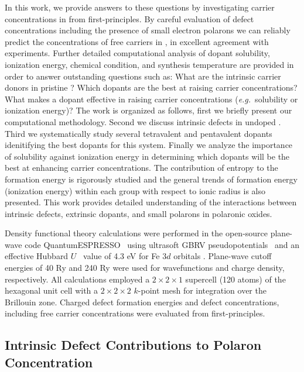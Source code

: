 In this work, we provide answers to these questions by investigating carrier concentrations in  from first-principles. By careful evaluation of defect concentrations including the presence of small electron polarons we can reliably predict the concentrations of free carriers in , in excellent agreement with experiments.
Further detailed computational analysis of dopant solubility, ionization energy, chemical condition, and synthesis temperature are provided in order to answer outstanding questions such as: What are the intrinsic carrier donors in pristine ? Which dopants are the best at raising carrier concentrations? What makes a dopant effective in raising carrier concentrations (\textit{e.g.}\ solubility or ionization energy)?
The work is organized as follows, first we briefly present our computational methodology. Second we discuss intrinsic defects in undoped . Third we systematically study several tetravalent and pentavalent dopants idenitifying the best dopants for this system. Finally we analyze the importance of solubility against ionization energy in determining which dopants will be the best at enhancing carrier concentrations. The contribution of entropy to the formation energy is rigorously studied and the general trends of formation energy (ionization energy) within each group with respect to ionic radius is also presented.
This work provides detailed understanding of the interactions between intrinsic defects, extrinsic dopants, and small polarons in polaronic oxides.

Density functional theory calculations were performed in the open-source plane-wave code QuantumESPRESSO~\cite{QE1} using ultrasoft GBRV pseudopotentials~\cite{gbrv} and an effective Hubbard $U$~\cite{dudarev1998electron} value of 4.3 eV for Fe $3d$ orbitals \cite{smart2017effect,adelstein2014density}.
Plane-wave cutoff energies of 40 Ry and 240 Ry were used for wavefunctions and charge density, respectively. All calculations employed a $2\times 2\times 1$ supercell (120 atoms) of the hexagonal unit cell with a $2\times 2\times 2$ $k$-point mesh for integration over the Brillouin zone.
Charged defect formation energies and defect concentrations, including free carrier concentrations were evaluated from first-principles.


\subsection{Intrinsic Defect Contributions to Polaron Concentration}

